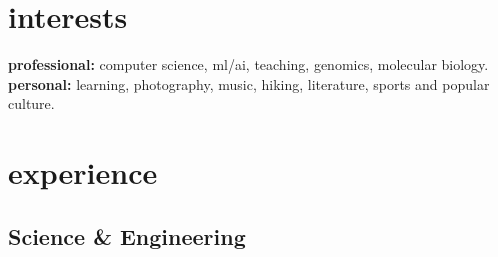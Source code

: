 \documentclass[]{friggeri-cv} %
\begin{document}
\section{interests}

\textbf{professional:} computer science, ml/ai, teaching, genomics, molecular
biology. \\
\textbf{personal:} learning, photography, music, hiking, literature, sports
and popular culture. \\


\section{experience}

\subsection{Science \& Engineering}
\end{document}
